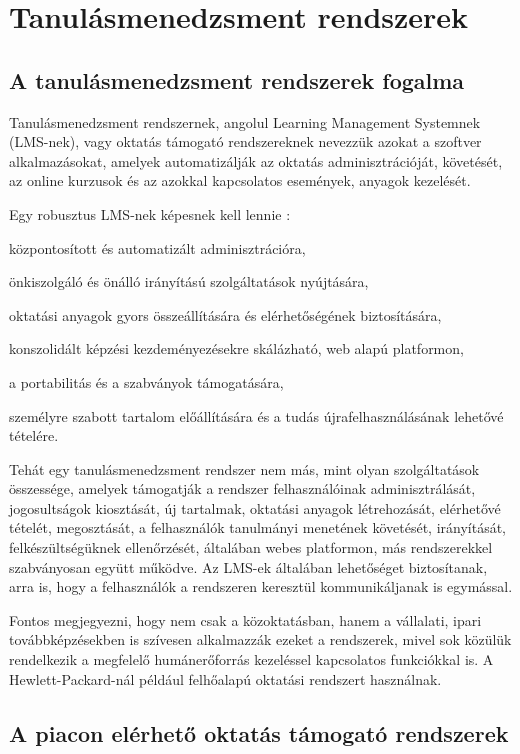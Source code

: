 \chapter{Tanulásmenedzsment rendszerek}
\section{A tanulásmenedzsment rendszerek fogalma}
Tanulásmenedzsment rendszernek, angolul Learning Management Systemnek (LMS-nek), vagy oktatás támogató rendszereknek nevezzük azokat a szoftver alkalmazásokat, amelyek automatizálják az oktatás adminisztrációját, követését, az online kurzusok és az azokkal kapcsolatos események, anyagok kezelését.

Egy robusztus LMS-nek képesnek kell lennie \cite{ellis2009}:
\begin{sajat_itemize}
\item központosított és automatizált adminisztrációra,
\item önkiszolgáló és önálló irányítású szolgáltatások nyújtására,
\item oktatási anyagok gyors összeállítására és elérhetőségének biztosítására,
\item konszolidált képzési kezdeményezésekre skálázható, web alapú platformon,
\item a portabilitás és a szabványok támogatására,
\item személyre szabott tartalom előállítására és a tudás újrafelhasználásának lehetővé tételére.
\end{sajat_itemize}

Tehát egy tanulásmenedzsment rendszer nem más, mint olyan szolgáltatások összessége, amelyek támogatják a rendszer felhasználóinak adminisztrálását, jogosultságok kiosztását, új tartalmak, oktatási anyagok létrehozását, elérhetővé tételét, megosztását, a felhasználók tanulmányi menetének követését, irányítását, felkészültségüknek ellenőrzését, általában webes platformon, más rendszerekkel szabványosan együtt működve. Az LMS-ek általában lehetőséget biztosítanak, arra is, hogy a felhasználók a rendszeren keresztül kommunikáljanak is egymással.

Fontos megjegyezni, hogy nem csak a közoktatásban, hanem a vállalati, ipari továbbképzésekben is szívesen alkalmazzák ezeket a rendszerek, mivel sok közülük rendelkezik a megfelelő humánerőforrás kezeléssel kapcsolatos funkciókkal is. A Hewlett-Packard-nál például felhőalapú oktatási rendszert használnak.

\section{A piacon elérhető oktatás támogató rendszerek}

